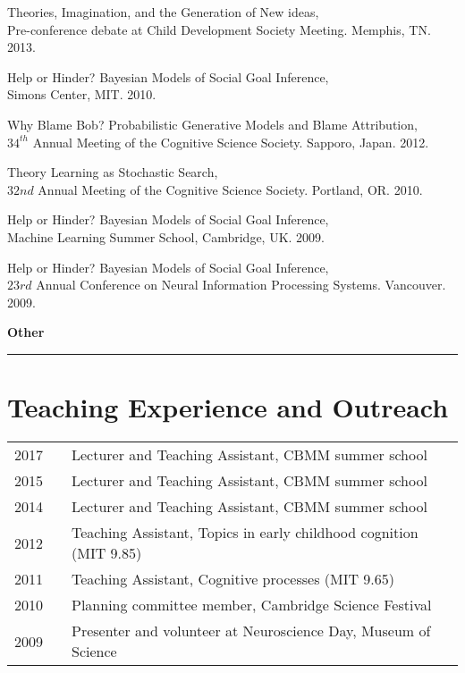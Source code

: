 \documentclass[margin,line,pifont,palatino,courier]{res}
\begin{document}
\begin{resume}
Theories, Imagination, and the Generation of New ideas,\\ Pre-conference debate at Child Development Society Meeting. Memphis, TN. 2013.

Help or Hinder? Bayesian Models of Social Goal Inference,\\ Simons Center, MIT. 2010.

Why Blame Bob? Probabilistic Generative Models and Blame Attribution,\\ $34^{th}$ Annual Meeting of the Cognitive Science Society. Sapporo, Japan. 2012.

Theory Learning as Stochastic Search,\\ $32nd$ Annual Meeting of the Cognitive Science Society. Portland, OR. 2010.

Help or Hinder? Bayesian Models of Social Goal Inference,\\ Machine Learning Summer School, Cambridge, UK. 2009.

Help or Hinder? Bayesian Models of Social Goal Inference,\\ $23rd$ Annual Conference on Neural Information Processing Systems. Vancouver. 2009.

\begin{adjustwidth*}{-17.8cm}{-2cm}

\hspace{-3.8em}\textbf{Other}\\
\hspace*{-3.8em}\noindent\rule{8cm}{0.4pt}

\end{adjustwidth*}

\section{\sc Teaching Experience and Outreach}

\begin{tabular}{@{}p{0.4in}p{0.3in}p{4in}}
2017 & & Lecturer and Teaching Assistant, CBMM summer school\\
2015 & & Lecturer and Teaching Assistant, CBMM summer school\\
2014 & & Lecturer and Teaching Assistant, CBMM summer school\\
2012 & & Teaching Assistant, Topics in early childhood cognition (MIT 9.85)\\
2011 & & Teaching Assistant, Cognitive processes (MIT 9.65)\\
2010 & & Planning committee member, Cambridge Science Festival\\
2009 & & Presenter and volunteer at Neuroscience Day, Museum of Science
\end{tabular}



\end{resume}
\end{document}
